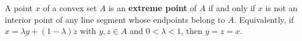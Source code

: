 A point $x$ of a convex set $A$ is an \textbf{extreme point} of $A$ if and only if $x$ is not an interior point of any line segment whose endpoints belong to $A$. Equivalently, if $x = \lambda y + (1 - \lambda)z$ with $y, z \in A$ and $0 < \lambda < 1$, then $y = z = x$.
